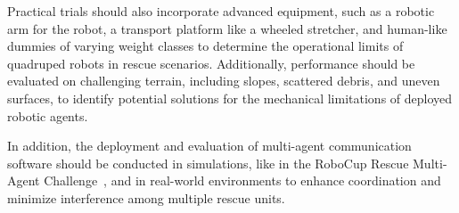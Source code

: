 \documentclass[3p,times,procedia]{elsarticle}
\begin{document}
Practical trials should also incorporate advanced equipment, such as a robotic arm for the robot, a transport platform like a wheeled stretcher, and human-like dummies of varying weight classes to determine the operational limits of quadruped robots in rescue scenarios. Additionally, performance should be evaluated on challenging terrain, including slopes, scattered debris, and uneven surfaces, to identify potential solutions for the mechanical limitations of deployed robotic agents.

In addition, the deployment and evaluation of multi-agent communication software should be conducted in simulations, like in the RoboCup Rescue Multi-Agent Challenge\ \cite{Visser2015RoboCup}, and in real-world environments to enhance coordination and minimize interference among multiple rescue units.









\end{document}
